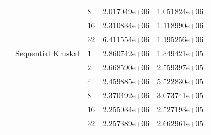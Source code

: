 \begin{tabular}{lllrr}
                       &                    & 8  &  2.017049e+06 &  1.051824e+06 \\
                       &                    & 16 &  2.310834e+06 &  1.118990e+06 \\
                       &                    & 32 &  6.411554e+06 &  1.195256e+06 \\
                       & Sequential Kruskal & 1  &  2.860742e+06 &  1.349421e+05 \\
                       &                    & 2  &  2.668590e+06 &  2.559397e+05 \\
                       &                    & 4  &  2.459885e+06 &  5.522830e+05 \\
                       &                    & 8  &  2.370492e+06 &  3.073741e+05 \\
                       &                    & 16 &  2.255034e+06 &  2.527193e+05 \\
                       &                    & 32 &  2.257389e+06 &  2.662961e+05 \\
\bottomrule
\end{tabular}
